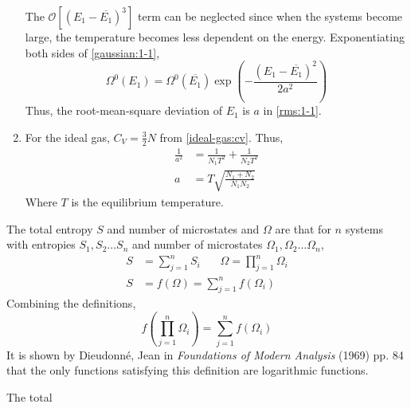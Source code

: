 \documentclass{article}
\begin{document}
\begin{sol}[1]
\begin{enumerate}[label=\textbf{(\alph*)}]
\begin{equation}
        \end{equation}
        The $\mathcal{O}\left[(E_1-\overline{E_1})^3\right]$ term can be neglected since when the systems become large, the temperature becomes less dependent on the energy.
        Exponentiating both sides of \eqref{gaussian:1-1},
        \begin{equation}
            \Omega^0(E_1)=\Omega^0(\overline{E_1})\exp\left(-\frac{(E_1-\overline{E_1})^2}{2a^2}\right)
        \end{equation}
        Thus, the root-mean-square deviation of $E_1$ is $a$ in \eqref{rms:1-1}.
        \item For the ideal gas, $C_V=\frac{3}{2}N$ from \eqref{ideal-gas:cv}. Thus, 
        \begin{align}
            \frac{1}{a^2}&=\frac{1}{N_1T^2}+\frac{1}{N_2T^2}\\
            a&=T\sqrt{\frac{N_1+N_2}{N_1N_2}}
        \end{align}
        Where $T$ is the equilibrium temperature.
    \end{enumerate}
\end{sol}
\begin{sol}[1]
    The total entropy $S$ and number of microstates and $\Omega$ are that for $n$ systems with entropies $S_1,S_2\dots S_n$ and number of microstates $\Omega_1,\Omega_2\dots\Omega_n$,
    \begin{align}
        S&=\sum_{j=1}^n S_i\:\:\:\:\:\:\:\:\Omega=\prod_{j=1}^n\Omega_i\\
        S&=f(\Omega)=\sum_{j=1}^n f(\Omega_i)
    \end{align}
    Combining the definitions,
    \begin{equation}
        f\left(\prod_{j=1}^n\Omega_i\right)=\sum_{j=1}^nf(\Omega_i)
    \end{equation}
    It is shown by Dieudonné, Jean in \textit{Foundations of Modern Analysis} (1969) pp. 84 that the only functions satisfying this definition are logarithmic functions.
\end{sol}
\begin{sol}[1]
    The total 
\end{sol}
\end{document}
